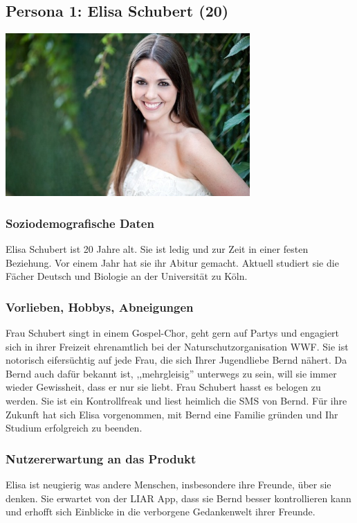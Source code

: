 \documentclass[10pt, a4paper, oneside, titlepage]{scrartcl} %
\begin{document}
	\subsection{Persona 1: Elisa Schubert (20)}
	\begin{center}
		\includegraphics[width=0.7\textwidth]{persona_01.jpg}
	\end{center}
	\subsubsection{Soziodemografische Daten}
	Elisa Schubert ist 20 Jahre alt. Sie ist ledig und zur Zeit in einer festen Beziehung. Vor einem Jahr hat sie ihr Abitur gemacht. Aktuell studiert sie die Fächer Deutsch und Biologie an der Universität zu Köln.
	\subsubsection{Vorlieben, Hobbys, Abneigungen}
	Frau Schubert singt in einem Gospel-Chor, geht gern auf Partys und engagiert sich in ihrer Freizeit ehrenamtlich bei der Naturschutzorganisation WWF. Sie ist notorisch eifersüchtig auf jede Frau, die sich Ihrer Jugendliebe Bernd nähert. Da Bernd auch dafür bekannt ist, ,,mehrgleisig'' unterwegs zu sein, will sie immer wieder Gewissheit, dass er nur sie liebt. Frau Schubert hasst es belogen zu werden. Sie ist ein Kontrollfreak und liest heimlich die SMS von Bernd. Für ihre Zukunft hat sich Elisa vorgenommen, mit Bernd eine Familie gründen und Ihr Studium erfolgreich zu beenden. 
	\subsubsection{Nutzererwartung an das Produkt}
	Elisa ist neugierig was andere Menschen, insbesondere ihre Freunde, über sie denken. Sie erwartet von der LIAR App, dass sie Bernd besser kontrollieren kann und erhofft sich Einblicke in die verborgene Gedankenwelt ihrer Freunde.
\end{document}
